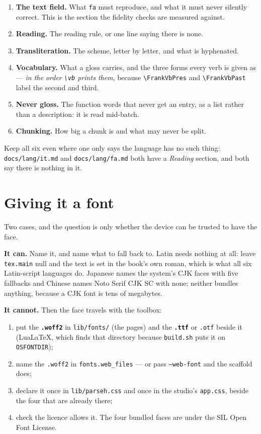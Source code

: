 \documentclass[11pt,oneside]{report}
\newcommand{\file}[1]{\texttt{#1}}
\begin{document}
\begin{enumerate}
\item \textbf{The text field.} What \texttt{fa} must reproduce, and what it
  must never silently correct. This is the section the fidelity checks are
  measured against.
\item \textbf{Reading.} The reading rule, or one line saying there is none.
\item \textbf{Transliteration.} The scheme, letter by letter, and what is
  hyphenated.
\item \textbf{Vocabulary.} What a gloss carries, and the three forms every verb
  is given as --- \emph{in the order \texttt{\textbackslash vb} prints them},
  because \texttt{\textbackslash FrankVbPres} and
  \texttt{\textbackslash FrankVbPast} label the second and third.
\item \textbf{Never gloss.} The function words that never get an entry, as a
  list rather than a description: it is read mid-batch.
\item \textbf{Chunking.} How big a chunk is and what may never be split.
\end{enumerate}

Keep all six even where one only says the language has no such thing:
\file{docs/lang/it.md} and \file{docs/lang/fa.md} both have a \emph{Reading}
section, and both say there is nothing in it.

\section{Giving it a font}
\label{sec:langfont}

Two cases, and the question is only whether the device can be trusted to have
the face.

\textbf{It can.} Name it, and name what to fall back to. Latin needs nothing
at all: leave \texttt{tex.main} null and the text is set in the book's own
roman, which is what all six Latin-script languages do. Japanese names the
system's CJK faces with five fallbacks and Chinese names Noto Serif CJK SC
with none; neither bundles anything, because a CJK font is tens of
megabytes.

\textbf{It cannot.} Then the face travels with the toolbox:

\begin{enumerate}
\item put the \textbf{\texttt{.woff2}} in \file{lib/fonts/} (the pages) and the
  \textbf{\texttt{.ttf}} or \texttt{.otf} beside it (LuaLaTeX, which finds that
  directory because \file{build.sh} puts it on \texttt{OSFONTDIR});
\item name the \texttt{.woff2} in \texttt{fonts.web\_files} --- or pass
  \texttt{--web-font} and the scaffold does;
\item declare it once in \file{lib/parseh.css} and once in the studio's
  \file{app.css}, beside the four that are already there;
\item check the licence allows it. The four bundled faces are under the SIL
  Open Font License.
\end{enumerate}
\end{document}
